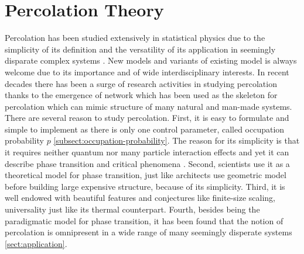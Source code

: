\chapter{Percolation Theory}

\ifpdf
    \graphicspath{{Chapter4/Figs/}{Chapter4/Figs/playground/}{Chapter4/Figs/entropy_cluster/}}
\else
    \graphicspath{{Chapter4/Figs/}{Chapter4/Figs/playground/}{Chapter4/Figs/entropy_cluster/}}
\fi

Percolation has been studied extensively in statistical physics due to the simplicity of its definition and the versatility of its application in seemingly disparate complex systems \cite{Sahini1994}. New models and variants of existing model is always welcome due to its importance and of wide interdisciplinary interests. In recent decades there has been a surge of research activities in studying percolation thanks to the emergence of network which has been used as the skeleton for percolation which can mimic structure of many natural and man-made systems.\\


There are several reason to study percolation. First, it is easy to formulate and simple to implement as there is only one control parameter, called occupation probability $p$ \ref{subsect:occupation-probability}. The reason for its simplicity is that it requires neither quantum nor many particle interaction effects and yet it can describe phase transition and critical phenomena \cite{Saberi2015, Stauffer1994}.  Second, scientists use it as a theoretical model for phase transition, just like architects use geometric model before building large expensive structure, because of its simplicity. Third, it is well endowed with beautiful features and conjectures like finite-size scaling, universality just like its thermal counterpart. Fourth, besides being the paradigmatic model for phase transition, it has been found that the notion of percolation is omnipresent in a wide range of many seemingly disperate systems \ref{sect:application}.\\

